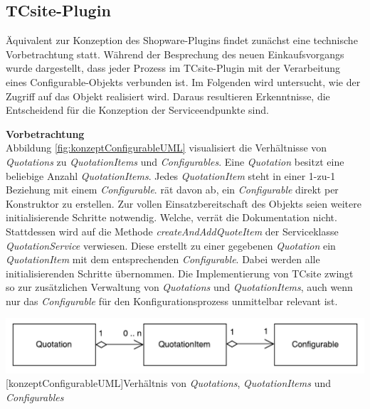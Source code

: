 \documentclass[11pt, a4paper, titlepage, listof=totoc, bibliography=totoc, index=totoc, twoside, openright, headings=normal, draft]{scrreprt}
\begin{document}
\subsection{TCsite-Plugin}
\label{TCsite-Plugin}
Äquivalent zur Konzeption des Shopware-Plugins findet zunächst eine technische Vorbetrachtung statt. Während der Besprechung des neuen Einkaufsvorgangs wurde dargestellt, dass jeder Prozess im TCsite-Plugin mit der Verarbeitung eines {Configurable}-Objekts verbunden ist. Im Folgenden wird untersucht, wie der Zugriff auf das Objekt realisiert wird. Daraus resultieren Erkenntnisse, die Entscheidend für die Konzeption der Serviceendpunkte sind.

\textbf{Vorbetrachtung}\\
Abbildung \ref{fig:konzeptConfigurableUML} visualisiert die Verhältnisse von \emph{Quotations} zu \emph{QuotationItems} und \emph{Configurables}. Eine \emph{Quotation} besitzt eine beliebige Anzahl \emph{QuotationItems}. Jedes \emph{QuotationItem} steht in einer 1-zu-1 Beziehung mit einem \emph{Configurable}. \citet{tactonTCsiteDevelopmentManual} rät davon ab, ein \emph{Configurable} direkt per Konstruktor zu erstellen. Zur vollen Einsatzbereitschaft des Objekts seien weitere initialisierende Schritte notwendig. Welche, verrät die Dokumentation nicht. Stattdessen wird auf die Methode \emph{createAndAddQuoteItem} der Serviceklasse \emph{QuotationService} verwiesen.  Diese erstellt zu einer gegebenen \emph{Quotation} ein \emph{QuotationItem} mit dem entsprechenden \emph{Configurable}. Dabei werden alle initialisierenden Schritte übernommen. Die Implementierung von TCsite zwingt so zur zusätzlichen Verwaltung von \emph{Quotations} und \emph{QuotationItems}, auch wenn nur das \emph{Configurable} für den Konfigurationsprozess unmittelbar relevant ist.

\vspace{1em}
\begin{minipage}{\linewidth}
	\centering
	\includegraphics[width=1\linewidth]{Abbildungen/konzeptConfigurableUML.pdf}
	[konzeptConfigurableUML]{Verhältnis von \emph{Quotations}, \emph{QuotationItems} und \emph{Configurables}}
	\label{fig:konzeptConfigurableUML}
\end{minipage}
\vspace{1em}
\end{document}
